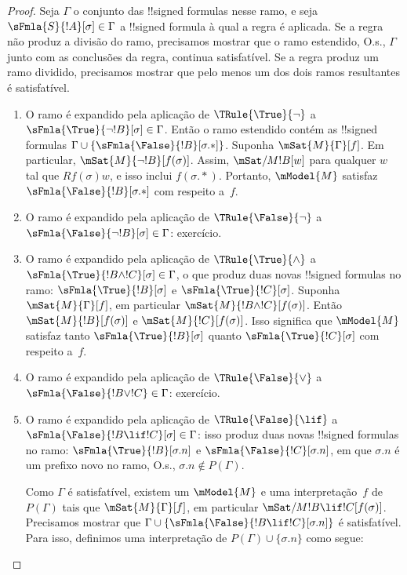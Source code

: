 \documentclass[../../../include/open-logic-section]{subfiles}
\begin{document}
\begin{proof}
Seja $\Gamma$ o conjunto das !!{signed formula}s nesse ramo, e seja
$\sFmla{S}{!A}[\sigma] \in \Gamma$ a !!{signed formula} à qual
a regra é aplicada. Se a regra não produz a divisão do ramo, precisamos
mostrar que o ramo estendido, O.s.\@, $\Gamma$ junto com
as conclusões da regra, continua satisfatível. Se a regra produz
um ramo dividido, precisamos mostrar que pelo menos um dos dois
ramos resultantes é satisfatível.
\begin{enumerate}
\item O ramo é expandido pela aplicação de $\TRule{\True}{\lnot}$ a
  $\sFmla{\True}{\lnot !B}[\sigma] \in \Gamma$. Então o ramo estendido
  contém as !!{signed formula}s $\Gamma \cup
  \{\sFmla{\False}{!B}[\sigma.{*}]\}$. Suponha $\mSat{M}{\Gamma}[f]$.
  Em particular, $\mSat{M}{\lnot !B}[f(\sigma)]$. Assim,
  $\mSat/{M}{!B}[w]$ para qualquer $w$ tal que $Rf(\sigma)w$, e isso
  inclui $f(\sigma.{*})$. Portanto, $\mModel{M}$ satisfaz
  $\sFmla{\False}{!B}[\sigma.{*}]$ com respeito a~$f$.
\item O ramo é expandido pela aplicação de $\TRule{\False}{\lnot}$ a
  $\sFmla{\False}{\lnot !B}[\sigma] \in \Gamma$: exercício.
\item O ramo é expandido pela aplicação de $\TRule{\True}{\land}$ a
  $\sFmla{\True}{!B \land !C}[\sigma] \in \Gamma$, o que produz
  duas novas !!{signed formula}s no ramo:
  $\sFmla{\True}{!B}[\sigma]$ e $\sFmla{\True}{!C}[\sigma]$. Suponha
  $\mSat{M}{\Gamma}[f]$, em particular $\mSat{M}{!B \land
    !C}[f(\sigma)]$. Então $\mSat{M}{!B}[f(\sigma)]$ e
  $\mSat{M}{!C}[f(\sigma)]$. Isso significa que $\mModel{M}$ satisfaz
  tanto $\sFmla{\True}{!B}[\sigma]$ quanto $\sFmla{\True}{!C}[\sigma]$
  com respeito a~$f$.
\item O ramo é expandido pela aplicação de $\TRule{\False}{\lor}$ a
  $\sFmla{\False}{!B \lor !C} \in \Gamma$: exercício.
\item O ramo é expandido pela aplicação de $\TRule{\False}{\lif}$ a
  $\sFmla{\False}{!B \lif !C}[\sigma] \in \Gamma$: isso produz duas
  novas !!{signed formula}s no ramo: $\sFmla{\True}{!B}[\sigma.n]$ e
  $\sFmla{\False}{!C}[\sigma.n]$, em que $\sigma.n$ é um
  prefixo novo no ramo, O.s.\@, $\sigma.n \notin P(\Gamma)$. 
  
  Como $\Gamma$ é satisfatível, existem um $\mModel{M}$ e uma
  interpretação~$f$ de $P(\Gamma)$ tais que $\mSat{M}{\Gamma}[f]$, em
  particular $\mSat/{M}{!B \lif !C}[f(\sigma)]$. Precisamos mostrar que
  $\Gamma \cup \{\sFmla{\False}{!B \lif !C}[\sigma.n]\}$ é
  satisfatível. Para isso, definimos uma interpretação de $P(\Gamma)
  \cup \{\sigma.n\}$ como segue:
  

\end{enumerate}
\end{proof}
\end{document}
